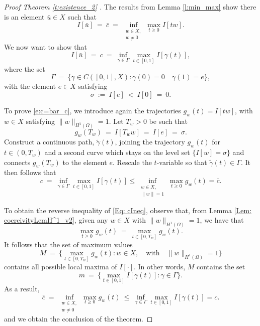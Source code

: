 \documentclass[11pt]{amsart}   	%
\theoremstyle{plain}
\numberwithin{equation}{section}
\begin{document}
\begin{proof}[Proof Theorem \ref{t:existence_2} ]
The results from Lemma \ref{l:min_max} show there is an element $\bar{u} \in X$ such that 
\begin{equation}\label{Eq: IDNInitial}
I[ \bar{u}] \ = \ \bar{c} \ = \  \inf_{\substack{w \in X, \\ w\neq 0}} \max_{t\geq 0} I[tw].
\end{equation}
We now want to show that 
\begin{equation}\label{e:c=bar_c}
 I[ \bar{u}] \ = \ c \ = \ \inf_{\gamma \in \Gamma} \max_{t \in [0,1]} I[\gamma(t)],
 \end{equation}
where the set
\[ \Gamma \ = \ \{ \gamma \in C([0,1], X): \gamma(0) = 0 \quad \gamma(1) = e\},\]
with the element $e \in X$ satisfying
\[ \sigma \ := \ I[e] \ < \ I[0] \ = \ 0.\]

To prove \eqref{e:c=bar_c}, we introduce again the trajectories
$g_w(t) =  I[tw]$,
with $w \in X $ satisfying $\|w\|_{H^1(\Omega)} = 1$. Let $T_w>0$ be such that
\[g_w(T_w) \ = \ I[T_w w] \ = \ I[e] \ = \ \sigma.\]
Construct a continuous path, $\tilde{\gamma}(t)$, joining the trajectory $g_w(t)$ for $t\in (0,T_w)$ and a second curve which stays on the level set $\{I[w]= \sigma\}$ and connects $g_w(T_w)$ to the element $e$. Rescale the $t$-variable so that $\tilde{\gamma}(t) \in \Gamma$. It then follows that
\begin{equation}\label{Eq: cIneq}
c \ = \ \inf_{\gamma \in \Gamma} \max_{t \in [0,1]} I[\gamma(t)] \leq \inf_{\substack{w \in X,\\ \|w\| =1}} \max_{t\geq 0}g_w(t)= \bar{c}.
\end{equation}

To obtain the reverse inequality of \eqref{Eq: cIneq}, observe that, from Lemma \ref{Lem: coercivityLemH^1_v2}, given any $w \in X$ with $\|w \|_{H^1(\Omega)} =1$,
 we have that
\[ \max_{t\geq 0} g_w(t)  \ = \ \max_{t\in [0,T_w]} g_w(t).\]
It follows that the set of maximum values
\[ M \ = \ \Big\{ \max_{t\in [0,T_w]} g_w(t) : w \in X, \quad \text{with} \quad \|w \|_{H^1(\Omega)} =1\Big\}\]
contains all possible local maxima of $I[\cdot]$. In other words, $M$ contains the set
\[ m \ = \ \Big\{  \max_{t \in [0,1]} I[\gamma(t)] : \gamma \in \Gamma\Big\}.\]
As a result,
\[ \bar{c} \ = \ \inf_{\substack{w \in X, \\ w\neq 0}} \max_{t \geq 0} g_w(t)\  \leq \ \inf_{\gamma \in \Gamma} \max_{t \in [0,1]} I[\gamma(t)] = c.\]
and we obtain the conclusion of the theorem.


\end{proof}
\end{document}
